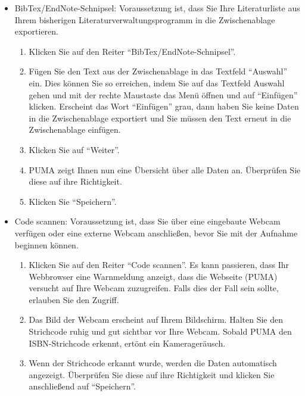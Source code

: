 \begin{enumerate}
\begin{itemize}
        \item BibTex/EndNote-Schnipsel:
        \newline
        Voraussetzung ist, dass Sie Ihre Literaturliste aus Ihrem bisherigen Literaturverwaltungsprogramm in die Zwischenablage exportieren.
        \begin{enumerate}
            \item Klicken Sie auf den Reiter \enquote{BibTex/EndNote-Schnipsel}.
            \item Fügen Sie den Text aus der Zwischenablage in das Textfeld \enquote{Auswahl} ein. Dies können Sie so erreichen, indem Sie auf das Textfeld Auswahl gehen und mit der rechte Maustaste das Menü öffnen und auf \enquote{Einfügen} klicken. Erscheint das Wort \enquote{Einfügen} grau, dann haben Sie keine Daten in die Zwischenablage exportiert und Sie müssen den Text erneut in die Zwischenablage einfügen.
            \item Klicken Sie auf \enquote{Weiter}.
            \item PUMA zeigt Ihnen nun eine Übersicht über alle Daten an. Überprüfen Sie diese auf ihre Richtigkeit.
            \item Klicken Sie \enquote{Speichern}.
        \end{enumerate}
        \item Code scannen: 
        \newline
        Voraussetzung ist, dass Sie über eine eingebaute Webcam verfügen oder eine externe Webcam anschließen, bevor Sie mit der Aufnahme beginnen können.
        \begin{enumerate}
            \item Klicken Sie auf den Reiter \enquote{Code scannen}. Es kann passieren, dass Ihr Webbrowser eine Warnmeldung anzeigt, dass die Webseite (PUMA) versucht auf Ihre Webcam zuzugreifen. Falls dies der Fall sein sollte, erlauben Sie den Zugriff.
            \item Das Bild der Webcam erscheint auf Ihrem Bildschirm. Halten Sie den Strichcode ruhig und gut sichtbar vor Ihre Webcam. Sobald PUMA den ISBN-Strichcode erkennt, ertönt ein Kamerageräusch.
            \item Wenn der Strichcode erkannt wurde, werden die Daten automatisch angezeigt. Überprüfen Sie diese auf ihre Richtigkeit und klicken Sie anschließend auf \enquote{Speichern}.
        \end{enumerate}
\begin{figure}[h!]

\end{figure}
\end{itemize}
\end{enumerate}

